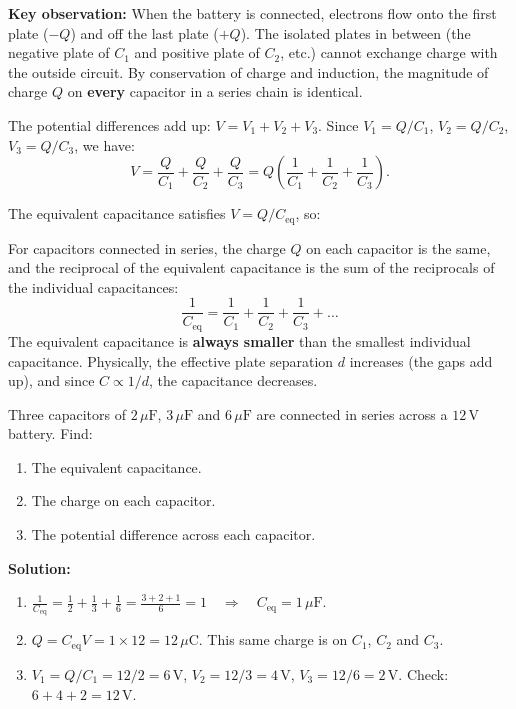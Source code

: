 \documentclass[11pt]{article}
\begin{document}
\noindent\textbf{Key observation:} When the battery is connected, electrons flow onto the first plate ($-Q$) and off the last plate ($+Q$). The isolated plates in between (the negative plate of $C_1$ and positive plate of $C_2$, etc.) cannot exchange charge with the outside circuit. By conservation of charge and induction, the magnitude of charge $Q$ on \textbf{every} capacitor in a series chain is identical.

The potential differences add up: $V = V_1 + V_2 + V_3$.
Since $V_1 = Q/C_1$, $V_2 = Q/C_2$, $V_3 = Q/C_3$, we have:
\[ V = \frac{Q}{C_1} + \frac{Q}{C_2} + \frac{Q}{C_3} = Q\left(\frac{1}{C_1} + \frac{1}{C_2} + \frac{1}{C_3}\right). \]

The equivalent capacitance satisfies $V = Q/C_{\text{eq}}$, so:

\begin{propriete}
For capacitors connected in series, the charge $Q$ on each capacitor is the same, and the reciprocal of the equivalent capacitance is the sum of the reciprocals of the individual capacitances:
\[ \frac{1}{C_{\text{eq}}} = \frac{1}{C_1} + \frac{1}{C_2} + \frac{1}{C_3} + \dots \]
The equivalent capacitance is \textbf{always smaller} than the smallest individual capacitance. Physically, the effective plate separation $d$ increases (the gaps add up), and since $C \propto 1/d$, the capacitance decreases.
\end{propriete}

\begin{exemplebox}
Three capacitors of $2\,\mu\mathrm{F}$, $3\,\mu\mathrm{F}$ and $6\,\mu\mathrm{F}$ are connected in series across a $12\,\mathrm{V}$ battery. Find:
\begin{enumerate}
\item The equivalent capacitance.
\item The charge on each capacitor.
\item The potential difference across each capacitor.
\end{enumerate}
\textbf{Solution:}
\begin{enumerate}
\item $\frac{1}{C_{\text{eq}}} = \frac{1}{2} + \frac{1}{3} + \frac{1}{6} = \frac{3+2+1}{6} = 1 \quad\Rightarrow\quad C_{\text{eq}} = 1\,\mu\mathrm{F}$.
\item $Q = C_{\text{eq}}V = 1 \times 12 = 12\,\mu\mathrm{C}$. This same charge is on $C_1$, $C_2$ and $C_3$.
\item $V_1 = Q/C_1 = 12/2 = 6\,\mathrm{V}$,
$V_2 = 12/3 = 4\,\mathrm{V}$,
$V_3 = 12/6 = 2\,\mathrm{V}$.
Check: $6 + 4 + 2 = 12\,\mathrm{V}$.
\end{enumerate}
\end{exemplebox}
\end{document}
